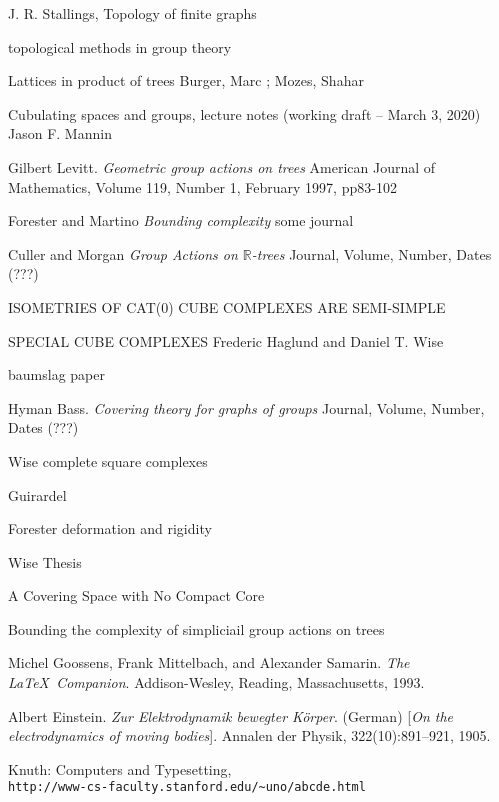 \documentclass[12pt,parskip=full]{report}
\theoremstyle{plain}
\theoremstyle{definition}
\begin{document}
\begin{thebibliography}{9}

 J. R. Stallings, Topology of finite graphs

topological methods in group theory

Lattices in product of trees
Burger, Marc  ; Mozes, Shahar

Cubulating spaces and groups, lecture notes
(working draft – March 3, 2020)
Jason F. Mannin

Gilbert Levitt.
\textit{Geometric group actions on trees}
American Journal of Mathematics, Volume 119, Number 1, February 1997, pp83-102

Forester and Martino
\textit{Bounding complexity}
some journal

Culler and Morgan
\textit{Group Actions on $\mathbb{R}$-trees}
Journal, Volume, Number, Dates (???)

ISOMETRIES OF CAT(0) CUBE COMPLEXES ARE SEMI-SIMPLE

SPECIAL CUBE COMPLEXES
Frederic Haglund and Daniel T. Wise

baumslag paper

Hyman Bass.
\textit{Covering theory for graphs of groups}
Journal, Volume, Number, Dates (???)


Wise complete square complexes

Guirardel

Forester deformation and rigidity

Wise Thesis

A Covering Space with No Compact Core

Bounding the complexity of simpliciail group actions
on trees 


Michel Goossens, Frank Mittelbach, and Alexander Samarin. 
\textit{The \LaTeX\ Companion}. 
Addison-Wesley, Reading, Massachusetts, 1993.

Albert Einstein. 
\textit{Zur Elektrodynamik bewegter K{\"o}rper}. (German) 
[\textit{On the electrodynamics of moving bodies}]. 
Annalen der Physik, 322(10):891–921, 1905.

Knuth: Computers and Typesetting,
\\\texttt{http://www-cs-faculty.stanford.edu/\~{}uno/abcde.html}

\end{thebibliography}



\end{document}
